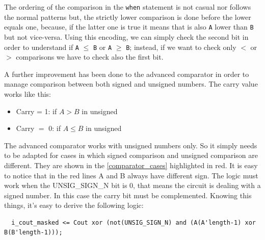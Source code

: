 The ordering of the comparison in the \texttt{when} statement is not casual nor follows the normal patterns but, the strictly lower comparison is done before the lower equals one, because, if the latter one is true it means that is also \texttt{A} lower than \texttt{B} but not vice-versa. Using this encoding, we can simply check the second bit in order to understand if \texttt{A} $\leq$ \texttt{B} or \texttt{A} $\geq$ \texttt{B}; instead, if we want to check only $<$ or $>$ comparisons we have to check also the first bit.

 

A further improvement has been done to the advanced comparator in order to manage comparison between both signed and unsigned numbers. The carry value works like this:
\begin{itemize}
  \item Carry = 1: if \(A > B\) in unsigned
  \item Carry \(=\) 0: if \(A \leq B\) in unsigned
\end{itemize}

The advanced comparator works with unsigned numbers only. So it simply needs to be adapted for cases in which signed comparison and unsigned comparison are different. They are shown in the \autoref{comparator_cases} highlighted in red. 
It is easy to notice that in the red lines A and B always have different sign. The logic must work when the UNSIG\_SIGN\_N bit is 0, that means the circuit is dealing with a signed number. In this case the carry bit must be complemented. Knowing this things, it's easy to derive the following logic:

\begin{verbatim}
  i_cout_masked <= Cout xor (not(UNSIG_SIGN_N) and (A(A'length-1) xor B(B'length-1)));
\end{verbatim}

